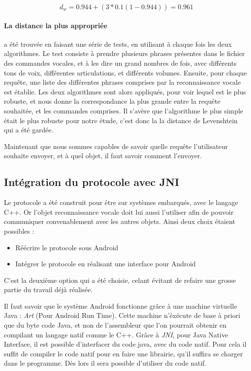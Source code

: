 \begin{equation}
  d_w=0.944+(3*0.1(1-0.944))=0.961
\end{equation}


\paragraph{La distance la plus appropriée} a été trouvée en faisant une série de tests, en utilisant à chaque 
fois les deux algorithmes. Le test consiste à prendre plusieurs phrases présentes dans le fichier des 
commandes vocales, et à les dire un grand nombres de fois, avec différents tons de voix, différentes 
articulations, et différents volumes. Ensuite, pour chaque requête, une liste des différentes phrases 
comprises par la reconnaissance vocale est établie. Les deux algorithmes sont alors appliqués, pour voir 
lequel est le plus robuste, et nous donne la correspondance la plus grande entre la requête souhaitée, et les 
commandes comprises. Il s'avère que l'algorithme le plus simple  était le plus robuste pour notre étude, 
c'est donc la la distance de Levenshtein qui a été gardée. 

Maintenant que nous sommes capables de savoir quelle requête l'utilisateur souhaite envoyer, et à quel objet, 
il faut savoir comment l'envoyer.

	\subsection{Intégration du protocole avec JNI}
Le protocole a été construit pour être sur systèmes embarqués, avec le langage C++. Or l'objet reconnaissance 
vocale doit lui aussi l'utiliser afin de pouvoir communiquer convenablement avec les autres objets. Ainsi deux 
choix étaient possibles :
\begin{itemize}
 \item Réécrire le protocole sous Android
 \item Intégrer le protocole en réalisant une interface pour Android
\end{itemize}

C'est la deuxième option qui a été choisie, celant évitant de refaire une grosse partie du travail déjà 
réalisée.

Il faut savoir que le système Android fonctionne grâce à une machine virtuelle Java : \emph{Art} (Pour 
Android Run Time). Cette machine n'éxécute de base à priori que du byte code Java, et non de l'assembleur que 
l'on pourrait obtenir en compilant un langage natif comme le C++. Grâce à \emph{JNI}, pour Java Native 
Interface, il est possible d'interfacer du code java, avec du code natif. Pour cela il suffit de compiler le 
code natif pour en faire une librairie, qu'il suffira se charger dans le programme. Dès lors il sera possible 
d'utiliser du code natif.


